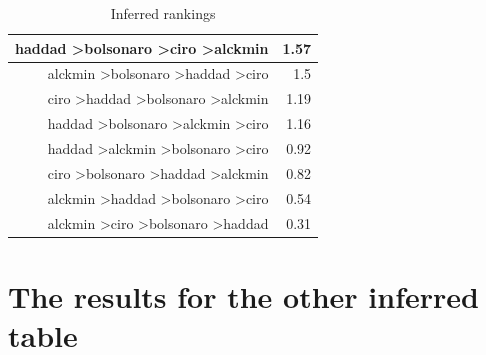\documentclass[hidelinks,11pt]{article}
\begin{document}
\begin{table}[H]
\begin{tabular}{|r|r|}
haddad \textgreater bolsonaro \textgreater ciro \textgreater alckmin & 1.57                                 \\ \hline
alckmin \textgreater bolsonaro \textgreater haddad \textgreater ciro & 1.5                                  \\ \hline
ciro \textgreater haddad \textgreater bolsonaro \textgreater alckmin & 1.19                                 \\ \hline
haddad \textgreater bolsonaro \textgreater alckmin \textgreater ciro & 1.16                                 \\ \hline
haddad \textgreater alckmin \textgreater bolsonaro \textgreater ciro & 0.92                                 \\ \hline
ciro \textgreater bolsonaro \textgreater haddad \textgreater alckmin & 0.82                                 \\ \hline
alckmin \textgreater haddad \textgreater bolsonaro \textgreater ciro & 0.54                                 \\ \hline
alckmin \textgreater ciro \textgreater bolsonaro \textgreater haddad & 0.31                                 \\ \hline
\end{tabular}
\caption{Inferred rankings}
\label{lab:inferred1}
\end{table}


\section{The results for the other inferred table}\label{appendix:transfer2_results}
\end{document}
